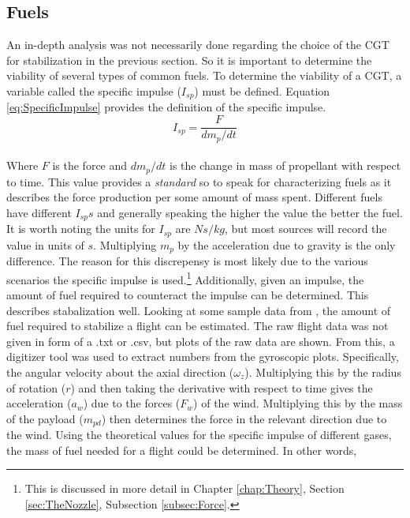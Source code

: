 \subsection{Fuels}\label{sec:Fuels}
An in-depth analysis was not necessarily done regarding the choice of the CGT for stabilization in the previous section. So it is important to determine the viability of several types of common fuels. To determine the viability of a CGT, a variable called the specific impulse ($I_{sp}$) must be defined. Equation \ref{eq:SpecificImpulse} provides the definition of the specific impulse.
\begin{equation}\label{eq:SpecificImpulse}
I_{sp}=\frac{F}{dm_p/dt}
\end{equation}%
%
%
%
\\
Where $F$ is the force and $dm_p/dt$ is the change in mass of propellant with respect to time. This value provides a \textit{standard} so to speak for characterizing fuels as it describes the force production per some amount of mass spent. Different fuels have different $I_{sp}s$ and generally speaking the higher the value the better the fuel. It is worth noting the units for $I_{sp}$ are $Ns/kg$, but most sources will record the value in units of $s$. Multiplying $m_p$ by the acceleration due to gravity is the only difference. The reason for this discrepensy is most likely due to the various scenarios the specific impulse is used.\footnote{This is discussed in more detail in Chapter \ref{chap:Theory}, Section \ref{sec:TheNozzle}, Subsection \ref{subsec:Force}.} Additionally, given an impulse, the amount of fuel required to counteract the impulse can be determined. This describes stabalization well. Looking at some sample data from \cite{titan1hab}, the amount of fuel required to stabilize a flight can be estimated. The raw flight data was not given in form of a .txt or .csv, but plots of the raw data are shown. From this, a digitizer tool was used to extract numbers from the gyroscopic plots. Specifically, the angular velocity about the axial direction ($\omega_z$). Multiplying this by the radius of rotation ($r$) and then taking the derivative with respect to time gives the acceleration ($a_w$) due to the forces ($F_w$) of the wind. Multiplying this by the mass of the payload ($m_{pd}$) then determines the force in the relevant direction due to the wind. Using the theoretical values for the specific impulse of different gases, the mass of fuel needed for a flight could be determined. In other words,
